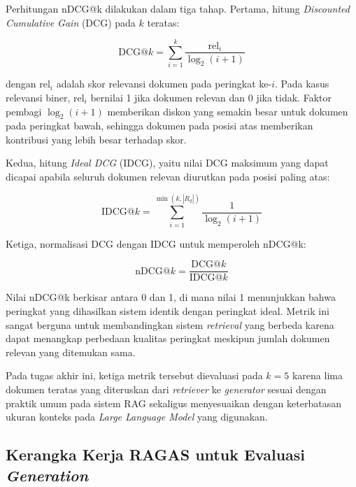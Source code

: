 Perhitungan nDCG@k dilakukan dalam tiga tahap. Pertama, hitung \textit{Discounted Cumulative Gain} (DCG) pada $k$ teratas:

\begin{equation}
\text{DCG@}k = \sum_{i=1}^{k} \frac{\text{rel}_i}{\log_2(i+1)}
\end{equation}

dengan $\text{rel}_i$ adalah skor relevansi dokumen pada peringkat ke-$i$. Pada kasus relevansi biner, $\text{rel}_i$ bernilai 1 jika dokumen relevan dan 0 jika tidak. Faktor pembagi $\log_2(i+1)$ memberikan diskon yang semakin besar untuk dokumen pada peringkat bawah, sehingga dokumen pada posisi atas memberikan kontribusi yang lebih besar terhadap skor.

Kedua, hitung \textit{Ideal DCG} (IDCG), yaitu nilai DCG maksimum yang dapat dicapai apabila seluruh dokumen relevan diurutkan pada posisi paling atas:

\begin{equation}
\text{IDCG@}k = \sum_{i=1}^{\min(k, |R_q|)} \frac{1}{\log_2(i+1)}
\end{equation}

Ketiga, normalisasi DCG dengan IDCG untuk memperoleh nDCG@k:

\begin{equation}
\text{nDCG@}k = \frac{\text{DCG@}k}{\text{IDCG@}k}
\end{equation}

Nilai nDCG@k berkisar antara 0 dan 1, di mana nilai 1 menunjukkan bahwa peringkat yang dihasilkan sistem identik dengan peringkat ideal. Metrik ini sangat berguna untuk membandingkan sistem \textit{retrieval} yang berbeda karena dapat menangkap perbedaan kualitas peringkat meskipun jumlah dokumen relevan yang ditemukan sama.

Pada tugas akhir ini, ketiga metrik tersebut dievaluasi pada $k=5$ karena lima dokumen teratas yang diteruskan dari \textit{retriever} ke \textit{generator} sesuai dengan praktik umum pada sistem RAG \parencite{ma2023queryrewriting, lewis2020retrieval} sekaligus menyesuaikan dengan keterbatasan ukuran konteks pada \textit{Large Language Model} yang digunakan.

\subsection{Kerangka Kerja RAGAS untuk Evaluasi \textit{Generation}}
\label{subsec:ragas-framework}


